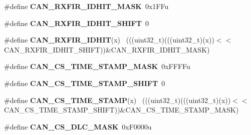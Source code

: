 \begin{DoxyCompactItemize}
\item 
\hypertarget{group___c_a_n___register___masks_ga097ddfd77b23ddd23341d8ea269ce64b}{}\#define {\bfseries C\+A\+N\+\_\+\+R\+X\+F\+I\+R\+\_\+\+I\+D\+H\+I\+T\+\_\+\+M\+A\+S\+K}~0x1\+F\+Fu\label{group___c_a_n___register___masks_ga097ddfd77b23ddd23341d8ea269ce64b}

\item 
\hypertarget{group___c_a_n___register___masks_ga6a1b5e43de75851c0bdc5690c1715a14}{}\#define {\bfseries C\+A\+N\+\_\+\+R\+X\+F\+I\+R\+\_\+\+I\+D\+H\+I\+T\+\_\+\+S\+H\+I\+F\+T}~0\label{group___c_a_n___register___masks_ga6a1b5e43de75851c0bdc5690c1715a14}

\item 
\hypertarget{group___c_a_n___register___masks_gadffc40bb06741a25f5370981de441db3}{}\#define {\bfseries C\+A\+N\+\_\+\+R\+X\+F\+I\+R\+\_\+\+I\+D\+H\+I\+T}(x)                                          ~(((uint32\+\_\+t)(((uint32\+\_\+t)(x))$<$$<$C\+A\+N\+\_\+\+R\+X\+F\+I\+R\+\_\+\+I\+D\+H\+I\+T\+\_\+\+S\+H\+I\+F\+T))\&C\+A\+N\+\_\+\+R\+X\+F\+I\+R\+\_\+\+I\+D\+H\+I\+T\+\_\+\+M\+A\+S\+K)\label{group___c_a_n___register___masks_gadffc40bb06741a25f5370981de441db3}

\item 
\hypertarget{group___c_a_n___register___masks_ga70e77ee06fb6bf69b46020d1e3b91819}{}\#define {\bfseries C\+A\+N\+\_\+\+C\+S\+\_\+\+T\+I\+M\+E\+\_\+\+S\+T\+A\+M\+P\+\_\+\+M\+A\+S\+K}~0x\+F\+F\+F\+Fu\label{group___c_a_n___register___masks_ga70e77ee06fb6bf69b46020d1e3b91819}

\item 
\hypertarget{group___c_a_n___register___masks_gaa9e77f6476678316f4bedf1b02afe0d0}{}\#define {\bfseries C\+A\+N\+\_\+\+C\+S\+\_\+\+T\+I\+M\+E\+\_\+\+S\+T\+A\+M\+P\+\_\+\+S\+H\+I\+F\+T}~0\label{group___c_a_n___register___masks_gaa9e77f6476678316f4bedf1b02afe0d0}

\item 
\hypertarget{group___c_a_n___register___masks_ga961d23351bf7a73fc6b00c69466eb4c4}{}\#define {\bfseries C\+A\+N\+\_\+\+C\+S\+\_\+\+T\+I\+M\+E\+\_\+\+S\+T\+A\+M\+P}(x)                                      ~(((uint32\+\_\+t)(((uint32\+\_\+t)(x))$<$$<$C\+A\+N\+\_\+\+C\+S\+\_\+\+T\+I\+M\+E\+\_\+\+S\+T\+A\+M\+P\+\_\+\+S\+H\+I\+F\+T))\&C\+A\+N\+\_\+\+C\+S\+\_\+\+T\+I\+M\+E\+\_\+\+S\+T\+A\+M\+P\+\_\+\+M\+A\+S\+K)\label{group___c_a_n___register___masks_ga961d23351bf7a73fc6b00c69466eb4c4}

\item 
\hypertarget{group___c_a_n___register___masks_ga968a36f7478c9fad396ac64b5f1f18a2}{}\#define {\bfseries C\+A\+N\+\_\+\+C\+S\+\_\+\+D\+L\+C\+\_\+\+M\+A\+S\+K}~0x\+F0000u\label{group___c_a_n___register___masks_ga968a36f7478c9fad396ac64b5f1f18a2}


\end{DoxyCompactItemize}
